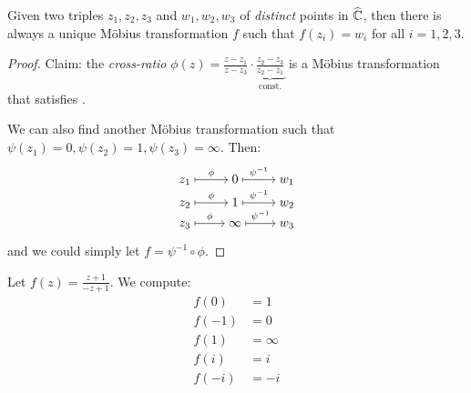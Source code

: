 \documentclass[12pt]{article}
\begin{document}
\begin{theorem}
    Given two triples $z_1,z_2,z_3$ and $w_1,w_2,w_3$ of \textit{distinct} points in $\widehat{\mathbb{C}}$, then there is always a unique Möbius transformation $f$ such that $f(z_i)=w_i$ for all $i=1,2,3$.
\end{theorem}
\begin{proof}
    Claim: the \textit{cross-ratio} $\phi(z)=\frac{z-z_1}{z-z_3}\cdot \underset{\text{const.}}{\underbrace{\frac{z_2-z_3}{z_2-z_1}}}$ is a Möbius transformation that satisfies .

    We can also find another Möbius transformation such that $\psi(z_1)=0, \psi(z_2)=1, \psi(z_3)=\infty$. Then:
    \[\begin{tikzcd}[ampersand replacement=\&,cramped,row sep=tiny]
        {z_1} \& 0 \& {w_1} \\
        {z_2} \& 1 \& {w_2} \\
        {z_3} \& \infty \& {w_3}
        \arrow["\phi", maps to, from=1-1, to=1-2]
        \arrow["{\psi^{-1}}", maps to, from=1-2, to=1-3]
        \arrow["\phi", maps to, from=2-1, to=2-2]
        \arrow["{\psi^{-1}}", maps to, from=2-2, to=2-3]
        \arrow["\phi", maps to, from=3-1, to=3-2]
        \arrow["{\psi^{-1}}", maps to, from=3-2, to=3-3]
    \end{tikzcd}\]

    and we could simply let $f=\psi^{-1}\circ \phi$.
\end{proof}

\eg Let $f(z)=\frac{z+1}{-z+1}$. We compute:\begin{align*}
    f(0)&=1\\
    f(-1)&=0\\
    f(1)&=\infty\\
    f(i)&=i\\
    f(-i)&=-i\\
\end{align*}
\end{document}

